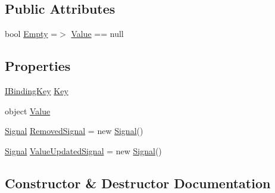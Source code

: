 \subsection*{Public Attributes}
\begin{DoxyCompactItemize}
\item 
bool \mbox{\hyperlink{classcp_games_1_1core_1_1_rapid_m_v_c_1_1impl_1_1_binding_a746307581d56690c0e5234f6cb3f04a5}{Empty}} =$>$ \mbox{\hyperlink{classcp_games_1_1core_1_1_rapid_m_v_c_1_1impl_1_1_binding_a2475a9fdd0df65b35b71437974c5d116}{Value}} == null
\end{DoxyCompactItemize}
\subsection*{Properties}
\begin{DoxyCompactItemize}
\item 
\mbox{\hyperlink{interfacecp_games_1_1core_1_1_rapid_m_v_c_1_1_i_binding_key}{I\+Binding\+Key}} \mbox{\hyperlink{classcp_games_1_1core_1_1_rapid_m_v_c_1_1impl_1_1_binding_a6c75caa9e8810b2bf42aa41ee05122af}{Key}}
\item 
object \mbox{\hyperlink{classcp_games_1_1core_1_1_rapid_m_v_c_1_1impl_1_1_binding_a2475a9fdd0df65b35b71437974c5d116}{Value}}
\item 
\mbox{\hyperlink{classcp_games_1_1core_1_1_rapid_m_v_c_1_1_signal}{Signal}} \mbox{\hyperlink{classcp_games_1_1core_1_1_rapid_m_v_c_1_1impl_1_1_binding_a250ddde1caae1342223d266a15cac94a}{Removed\+Signal}} = new \mbox{\hyperlink{classcp_games_1_1core_1_1_rapid_m_v_c_1_1_signal}{Signal}}()
\item 
\mbox{\hyperlink{classcp_games_1_1core_1_1_rapid_m_v_c_1_1_signal}{Signal}} \mbox{\hyperlink{classcp_games_1_1core_1_1_rapid_m_v_c_1_1impl_1_1_binding_a5111c5c62f8b0f061c2f21ff67bfe561}{Value\+Updated\+Signal}} = new \mbox{\hyperlink{classcp_games_1_1core_1_1_rapid_m_v_c_1_1_signal}{Signal}}()
\end{DoxyCompactItemize}


\subsection{Constructor \& Destructor Documentation}
\mbox{\label{classcp_games_1_1core_1_1_rapid_m_v_c_1_1impl_1_1_binding_aa53ebf2d17f246c0af5c6e4e4383ba54}} 
